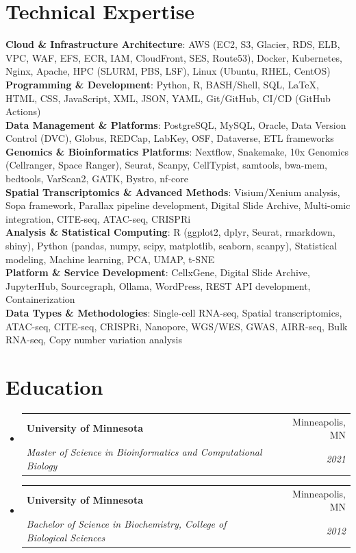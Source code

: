 \documentclass[letterpaper,10]{article}
\makeatletter
\newcommand{\resumeSubheading}[4]{
  \vspace{-2pt}\item
    \begin{tabular*}{0.97\textwidth}[t]{l@{\extracolsep{\fill}}r}
      \textbf{#1} & #2 \\
      \textit{\small#3} & \textit{\small #4} \\
    \end{tabular*}\vspace{-7pt}
}
\newcommand{\resumeSubHeadingListStart}{\begin{itemize}[leftmargin=0.15in, label={}]}
\newcommand{\resumeSubHeadingListEnd}{\end{itemize}}
\makeatother
\begin{document}
\section{Technical Expertise}
 \begin{itemize}[leftmargin=0.15in, label={}]
    \small{\item{
     \textbf{Cloud \& Infrastructure Architecture}{: AWS (EC2, S3, Glacier, RDS, ELB, VPC, WAF, EFS, ECR, IAM, CloudFront, SES, Route53), Docker, Kubernetes, Nginx, Apache, HPC (SLURM, PBS, LSF), Linux (Ubuntu, RHEL, CentOS)} \\
     \textbf{Programming \& Development}{: Python, R, BASH/Shell, SQL, LaTeX, HTML, CSS, JavaScript, XML, JSON, YAML, Git/GitHub, CI/CD (GitHub Actions)} \\
     \textbf{Data Management \& Platforms}{: PostgreSQL, MySQL, Oracle, Data Version Control (DVC), Globus, REDCap, LabKey, OSF, Dataverse, ETL frameworks} \\
     \textbf{Genomics \& Bioinformatics Platforms}{: Nextflow, Snakemake, 10x Genomics (Cellranger, Space Ranger), Seurat, Scanpy, CellTypist, samtools, bwa-mem, bedtools, VarScan2, GATK, Bystro, nf-core} \\
     \textbf{Spatial Transcriptomics \& Advanced Methods}{: Visium/Xenium analysis, Sopa framework, Parallax pipeline development, Digital Slide Archive, Multi-omic integration, CITE-seq, ATAC-seq, CRISPRi} \\
     \textbf{Analysis \& Statistical Computing}{: R (ggplot2, dplyr, Seurat, rmarkdown, shiny), Python (pandas, numpy, scipy, matplotlib, seaborn, scanpy), Statistical modeling, Machine learning, PCA, UMAP, t-SNE} \\
     \textbf{Platform \& Service Development}{: CellxGene, Digital Slide Archive, JupyterHub, Sourcegraph, Ollama, WordPress, REST API development, Containerization} \\
     \textbf{Data Types \& Methodologies}{: Single-cell RNA-seq, Spatial transcriptomics, ATAC-seq, CITE-seq, CRISPRi, Nanopore, WGS/WES, GWAS, AIRR-seq, Bulk RNA-seq, Copy number variation analysis}
    }}
 \end{itemize}

\section{Education}
  \resumeSubHeadingListStart
    \resumeSubheading
      {University of Minnesota}{Minneapolis, MN}
      {Master of Science in Bioinformatics and Computational Biology}{2021}
    \resumeSubheading
      {University of Minnesota}{Minneapolis, MN}
      {Bachelor of Science in Biochemistry, College of Biological Sciences}{2012}
  \resumeSubHeadingListEnd

\end{document}
